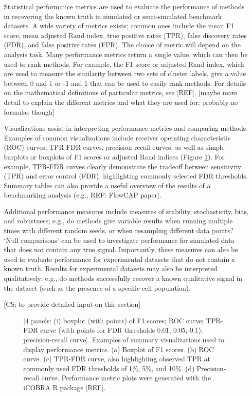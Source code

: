 \documentclass[12pt, a4paper]{article}
\begin{document}
Statistical performance metrics are used to evaluate the performance of methods in recovering the known truth in simulated or semi-simulated benchmark datasets. A wide variety of metrics exists; common ones include the mean F1 score, mean adjusted Rand index, true positive rates (TPR), false discovery rates (FDR), and false positive rates (FPR). The choice of metric will depend on the analysis task. Many performance metrics return a single value, which can then be used to rank methods. For example, the F1 score or adjusted Rand index, which are used to measure the similarity between two sets of cluster labels, give a value between 0 and 1 or -1 and 1 that can be used to easily rank methods. For details on the mathematical definitions of particular metrics, see [REF]. [maybe more detail to explain the different metrics and what they are used for; probably no formulas though]

Visualizations assist in interpreting performance metrics and comparing methods. Examples of common visualizations include receiver operating characteristic (ROC) curves, TPR-FDR curves, precision-recall curves, as well as simple barplots or boxplots of F1 scores or adjusted Rand indices (Figure \ref{fig:performance_metrics}). For example, TPR-FDR curves clearly demonstrate the tradeoff between sensitivity (TPR) and error control (FDR), highlighting commonly selected FDR thresholds. Summary tables can also provide a useful overview of the results of a benchmarking analysis (e.g., REF: FlowCAP paper).

Additional performance measures include measures of stability, stochasticity, bias, and robustness; e.g., do methods give variable results when running multiple times with different random seeds, or when resampling different data points? `Null comparisons' can be used to investigate performance for simulated data that does not contain any true signal. Importantly, these measures can also be used to evaluate performance for experimental datasets that do not contain a known truth. Results for experimental datasets may also be interpreted qualitatively; e.g., do methods successfully recover a known qualitative signal in the dataset (such as the presence of a specific cell population).

[CS: to provide detailed input on this section]



\vskip 5mm

\begin{figure}[H]
\begin{center}
\end{center}
\caption{[4 panels: (i) boxplot (with points) of F1 scores; ROC curve; TPR-FDR curve (with points for FDR thresholds 0.01, 0.05, 0.1); precision-recall curve]. Examples of summary visualizations used to display performance metrics. (a) Boxplot of F1 scores. (b) ROC curve. (c) TPR-FDR curve, also highlighting observed TPR at commonly used FDR thresholds of 1\%, 5\%, and 10\%. (d) Precision-recall curve. Performance metric plots were generated with the iCOBRA R package [REF].}
\label{fig:performance_metrics}
\end{figure}
\end{document}
